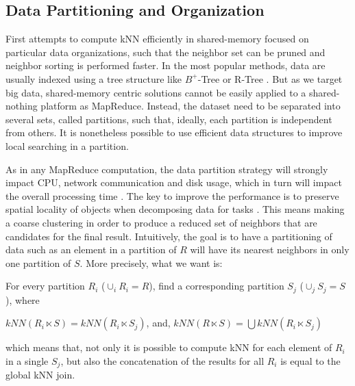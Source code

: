 \subsection{Data Partitioning and Organization}
First attempts to compute kNN efficiently in shared-memory focused on particular data organizations, such that the neighbor set can be pruned and neighbor sorting is 
performed faster. 
In the most popular methods, data are 
usually indexed using a tree structure like $B^+$-Tree \cite{DBLP:journals/tods/JagadishOTYZ05} or R-Tree \cite{MuX}. But as we 
target big data, shared-memory centric solutions cannot be easily applied to a shared-nothing platform as MapReduce. 
Instead, the dataset need to be separated into several sets, called partitions, such that, ideally, each partition is 
independent from others. It is nonetheless possible to use efficient data structures to improve local searching in a partition. 

As in any MapReduce computation, the data partition 
strategy will strongly impact CPU, network communication and disk usage, which in turn will impact the overall processing 
time\cite{DBLP:conf/hpcc/SongMHMYL13}
. 
The key to improve the performance is to preserve spatial locality of objects when decomposing data for tasks 
\cite{Zhou:1998:DPP:594718.594759}. This 
means making a coarse clustering in order to produce a reduced set of neighbors that are candidates for the final result. Intuitively,
the goal is to have a partitioning of data such as an element in a partition of $R$ will have its nearest neighbors 
in only one partition of $S$. More precisely, what we want is:

For every partition $R_i$ ($\cup_{i}R_i=R$), find a corresponding partition $S_j$ ($\cup_{j}S_j=S$), where
\begin{center}
$kNN(R_i \ltimes S) = kNN(R_i \ltimes S_j)$, and, 
$kNN(R \ltimes S) = \bigcup kNN(R_i \ltimes S_j)$
\end{center}
which means that, not only it is possible to compute kNN for each element of $R_i$ in a single $S_j$, but also the concatenation of the results for all $R_i$ is equal to the global kNN join.


